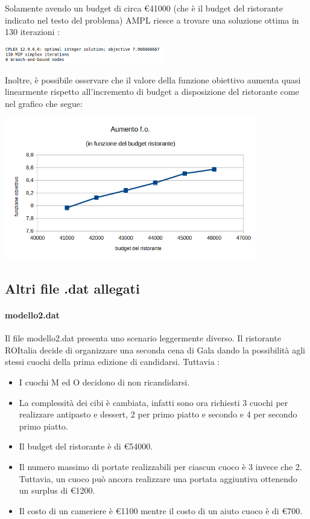 \documentclass[../modello-progetto.tex]{subfiles}
\begin{document}
Solamente avendo un budget di circa €41000 (che è il budget del ristorante indicato nel testo del problema) AMPL riesce a trovare una soluzione ottima in 130 iterazioni :
\begin{center}
	\includegraphics[width= 7cm]{img/41000-result.png}
\end{center}
Inoltre, è possibile osservare che il valore della funzione obiettivo aumenta quasi linearmente rispetto all'incremento di budget a disposizione del ristorante come nel grafico che segue:
\begin{center}
	\centering
	\includegraphics[width= 11cm]{img/grafico.png}
\end{center}

\subsection{Altri file .dat allegati}%
\label{sub:altri_.dat_allegati}

\paragraph{modello2.dat}%
\label{par:modello2.dat}

Il file modello2.dat presenta uno scenario leggermente diverso. Il ristorante ROItalia decide di organizzare una seconda cena di Gala dando la possibilità agli stessi cuochi della prima edizione di candidarsi. Tuttavia :
\begin{itemize}
	\item I cuochi M ed O decidono di non ricandidarsi.
	\item La complessità dei cibi è cambiata, infatti sono ora richiesti 3 cuochi per realizzare antipasto e dessert, 2 per primo piatto e secondo e 4 per secondo primo piatto.
	\item Il budget del ristorante è di €54000.
	\item Il numero massimo di portate realizzabili per ciascun cuoco è 3 invece che 2. Tuttavia, un cuoco può ancora realizzare una portata aggiuntiva ottenendo un surplus di €1200.
	\item Il costo di un cameriere è €1100 mentre il costo di un aiuto cuoco è di €700.
\end{itemize}
\end{document}
